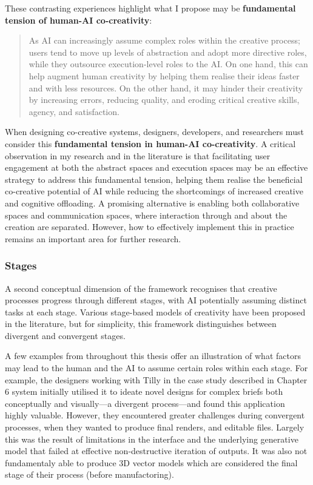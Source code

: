 These contrasting experiences highlight what I propose may be \textbf{fundamental tension of human-AI co-creativity}:

\begin{quote}
    As AI can increasingly assume complex roles within the creative process; users tend to move up levels of abstraction and adopt more directive roles, while they outsource execution-level roles to the AI. On one hand, this can help augment human creativity by helping them realise their ideas faster and with less resources. On the other hand, it may hinder their creativity by increasing errors, reducing quality, and eroding critical creative skills, agency, and satisfaction.
\end{quote}

When designing co-creative systems, designers, developers, and researchers must consider this \textbf{fundamental tension in human-AI co-creativity}. A critical observation in my research and in the literature is that facilitating user engagement at both the abstract spaces and execution spaces may be an effective strategy to address this fundamental tension, helping them realise the beneficial co-creative potential of AI while reducing the shortcomings of increased creative and cognitive offloading. A promising alternative is enabling both collaborative spaces and communication spaces, where interaction through and about the creation are separated. However, how to effectively implement this in practice remains an important area for further research. 

\subsubsection{Stages}

A second conceptual dimension of the framework recognises that creative processes progress through different stages, with AI potentially assuming distinct tasks at each stage. Various stage-based models of creativity have been proposed in the literature, but for simplicity, this framework distinguishes between divergent and convergent stages.

A few examples from throughout this thesis offer an illustration of what factors may lead to the human and the AI to assume certain roles within each stage. For example, the designers working with Tilly in the case study described in Chapter 6 system initially utilised it to ideate novel designs for complex briefs both conceptually and visually—a divergent process—and found this application highly valuable. However, they encountered greater challenges during convergent processes, when they wanted to produce final renders, and editable files. Largely this was the result of limitations in the interface and the underlying generative model that failed at effective non-destructive iteration of outputs. It was also not fundamentaly able to produce 3D vector models which are considered the final stage of their process (before manufactoring). 

